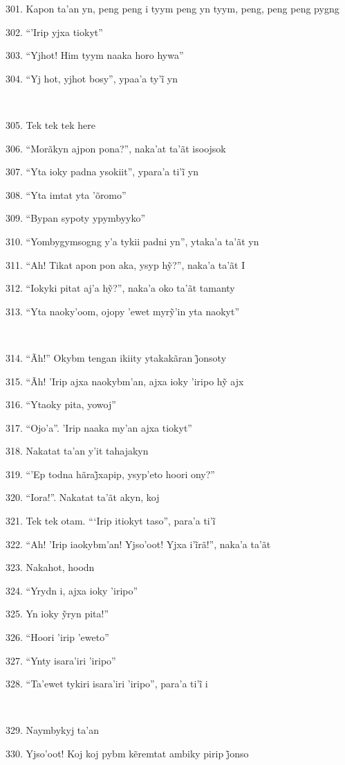 301. Kapon ta'an yn, peng peng i tyym peng yn tyym, peng, peng peng pygng

302. ``'Irip yjxa tiokyt''

303. ``Yjhot! Him tyym naaka horo hywa''

304. ``Yj hot, yjhot bosy'', ypaa’a ty’ĩ yn

~

305. Tek tek tek here

306. ``Morãkyn ajpon pona?'', naka'at ta'ãt isoojsok

307. ``Yta ioky padna ysokiit'', ypara’a ti’ĩ yn

308. ``Yta imtat yta 'õromo''

309. ``Bypan sypoty ypymbyyko''

310. ``Yombygymsogng y'a tykii padni yn'', ytaka'a ta'ãt yn

311. ``Ah! Tikat apon pon aka, ysyp hỹ?'', naka’a ta’ãt I

312. ``Iokyki pitat aj’a hỹ?'', naka’a oko ta’ãt tamanty

313. ``Yta naoky’oom, ojopy ’ewet myrỹ’in yta naokyt''

~

314. ``Ãh!'' Okybm tengan ikiity ytakakãran j̃onsoty

315. ``Ãh! ’Irip ajxa naokybm’an, ajxa ioky ’iripo hỹ ajx

316. ``Ytaoky pita, yowoj''

317. ``Ojo'a''. 'Irip naaka my'an ajxa tiokyt''

318. Nakatat ta'an y'it tahajakyn

319. ``’Ep todna hãraj̃xapip, ysyp’eto hoori ony?''

320. ``Iora!''. Nakatat ta'ãt akyn, koj

321. Tek tek otam. ``‘Irip itiokyt taso'', para’a ti’ĩ

322. ``Ah! ’Irip iaokybm’an! Yjso’oot! Yjxa i’ĩrã!'', naka’a ta’ãt

323. Nakahot, hoodn

324. ``Yrydn i, ajxa ioky 'iripo''

325. Yn ioky ỹryn pita!''

326. ``Hoori 'irip 'eweto''

327. ``Ynty isara'iri 'iripo''

328. ``Ta’ewet tykiri isara’iri ’iripo'', para’a ti’ĩ i

~

329. Naymbykyj ta'an

330. Yjso’oot! Koj koj pybm kẽremtat ambiky pirip j̃onso

